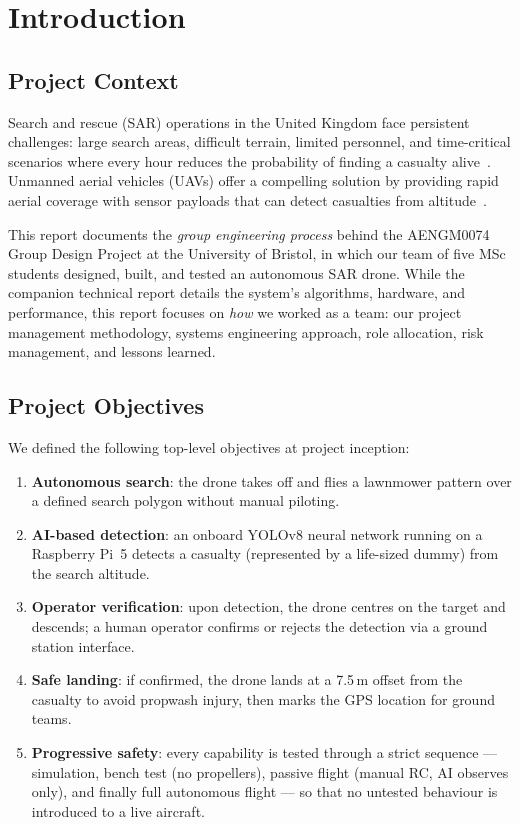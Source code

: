 \section{Introduction}
\label{sec:introduction}

\subsection{Project Context}

Search and rescue (SAR) operations in the United Kingdom face persistent challenges: large search areas, difficult terrain, limited personnel, and time-critical scenarios where every hour reduces the probability of finding a casualty alive~\cite{murphy2014, goodrich2008}. Unmanned aerial vehicles (UAVs) offer a compelling solution by providing rapid aerial coverage with sensor payloads that can detect casualties from altitude~\cite{sarreview, mishra2020}.

This report documents the \textit{group engineering process} behind the AENGM0074 Group Design Project at the University of Bristol, in which our team of five MSc students designed, built, and tested an autonomous SAR drone. While the companion technical report details the system's algorithms, hardware, and performance, this report focuses on \textit{how} we worked as a team: our project management methodology, systems engineering approach, role allocation, risk management, and lessons learned.

\subsection{Project Objectives}

We defined the following top-level objectives at project inception:

\begin{enumerate}
  \item \textbf{Autonomous search}: the drone takes off and flies a lawnmower pattern over a defined search polygon without manual piloting.
  \item \textbf{AI-based detection}: an onboard YOLOv8 neural network running on a Raspberry Pi~5 detects a casualty (represented by a life-sized dummy) from the search altitude.
  \item \textbf{Operator verification}: upon detection, the drone centres on the target and descends; a human operator confirms or rejects the detection via a ground station interface.
  \item \textbf{Safe landing}: if confirmed, the drone lands at a 7.5\,m offset from the casualty to avoid propwash injury, then marks the GPS location for ground teams.
  \item \textbf{Progressive safety}: every capability is tested through a strict sequence --- simulation, bench test (no propellers), passive flight (manual RC, AI observes only), and finally full autonomous flight --- so that no untested behaviour is introduced to a live aircraft.
\end{enumerate}

